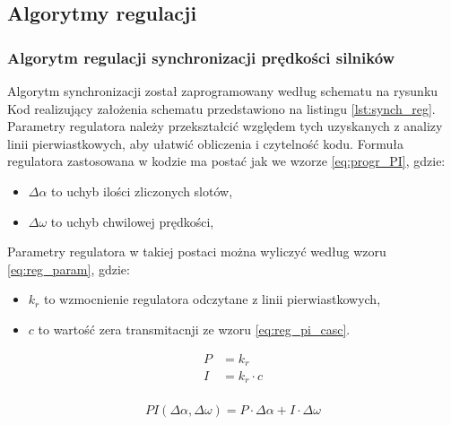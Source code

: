 \documentclass[11pt]{article}
\begin{document}
\subsection{Algorytmy regulacji}
\subsubsection{Algorytm regulacji synchronizacji prędkości silników}
Algorytm synchronizacji został zaprogramowany według schematu na rysunku %
Kod realizujący założenia schematu przedstawiono na listingu \ref{lst:synch_reg}.
Parametry regulatora należy przekształcić względem tych uzyskanych z analizy linii pierwiastkowych, aby ułatwić obliczenia i czytelność kodu.
Formuła regulatora zastosowana w kodzie ma postać jak we wzorze \ref{eq:progr_PI}, gdzie:
\begin{itemize}
	\item $ \Delta \alpha $ to uchyb ilości zliczonych slotów,
	\item $ \Delta \omega $ to uchyb chwilowej prędkości,
\end{itemize}
Parametry regulatora w takiej postaci można wyliczyć według wzoru \ref{eq:reg_param}, gdzie:
\begin{itemize}
	\item $ k_r $ to wzmocnienie regulatora odczytane z linii pierwiastkowych,
	\item $ c $ to wartość zera transmitacnji ze wzoru \ref{eq:reg_pi_casc}.
\end{itemize}

\begin{equation} \label{eq:reg_param}
\begin{aligned}
	P &=  k_r\\
	I &=  k_r \cdot c\\
\end{aligned}
\end{equation}


\begin{equation} \label{eq:progr_PI}
	PI \left( \Delta \alpha, \Delta \omega \right) = P \cdot \Delta \alpha + I \cdot \Delta \omega
\end{equation}




\end{document}
